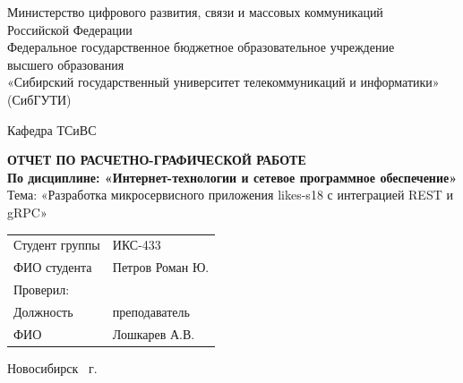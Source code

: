 \begin{titlepage}
\begin{center}
    Министерство цифрового развития, связи и массовых коммуникаций \\
    Российской Федерации \\[1em]
    Федеральное государственное бюджетное образовательное учреждение \\
    высшего образования \\
    «Сибирский государственный университет телекоммуникаций и информатики» \\
    (СибГУТИ) \\[2em]
\end{center}

\begin{flushright}
    Кафедра ТСиВС
\end{flushright}
\vspace{2em}

\begin{center}
    {\Large \bfseries ОТЧЕТ ПО РАСЧЕТНО-ГРАФИЧЕСКОЙ РАБОТЕ} \\[1em]
    {\large \bfseries По дисциплине: «Интернет-технологии и сетевое программное обеспечение»} \\[1em]
    {\large Тема: «Разработка микросервисного приложения likes-s18 с интеграцией REST и gRPC»} \\[3em]
\end{center}

\begin{flushright}
    \begin{tabular}{ll}
    Студент группы & ИКС-433 \\
    ФИО студента & Петров Роман Ю. \\[1em]
    \multicolumn{2}{l}{Проверил:} \\
    Должность & преподаватель \\
    ФИО & Лошкарев А.В. \\
    \end{tabular}
\end{flushright}

\vfill

\begin{center}
    Новосибирск \the\year~г.
\end{center}
\end{titlepage}
